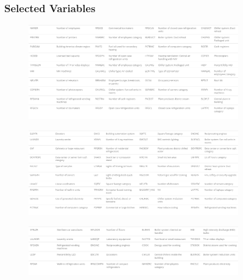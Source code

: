 \FloatBarrier
\newpage
\begin{figure}[ht]
\subsubsection{Selected Variables}
\label{appendix_nn:electricity:nn_full_variables}
\begin{subfigure}{1\textwidth}
\centering
\includegraphics[width=.99\textwidth, height=0.35\textheight]{Images/electricity_nn_full_variables_1.png}
\end{subfigure}
\begin{subfigure}{1\textwidth}
\centering
\includegraphics[width=.99\textwidth, height=0.35\textheight]{Images/electricity_nn_full_variables_2.png}
\end{subfigure}
\begin{subfigure}{1\textwidth}
\centering
\includegraphics[width=.99\textwidth, height=0.18\textheight]{Images/electricity_nn_full_variables_3.png}
\end{subfigure}
\end{figure}